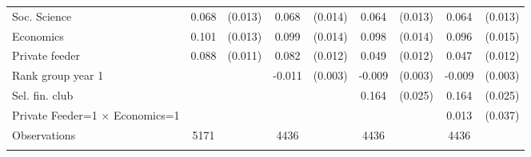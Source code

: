 \begin{tabular}{l*{8}{c}}
\addlinespace
Soc. Science &0.068& (0.013)&0.068& (0.014)&0.064& (0.013)&0.064& (0.013)\\
\addlinespace
Economics &0.101& (0.013)&0.099& (0.014)&0.098& (0.014)&0.096& (0.015)\\
\addlinespace
Private feeder &0.088& (0.011)&0.082& (0.012)&0.049& (0.012)&0.047& (0.012)\\
\addlinespace
Rank group year 1 &&&-0.011& (0.003)&-0.009& (0.003)&-0.009& (0.003)\\
\addlinespace
Sel. fin. club &&&&&0.164& (0.025)&0.164& (0.025)\\
\addlinespace
Private Feeder=1 $\times$ Economics=1 &&&&&&&0.013& (0.037)\\
\addlinespace
\midrule
Observations&     5171&&     4436&&     4436&&     4436&\\
\midrule
\addlinespace
\end{tabular}